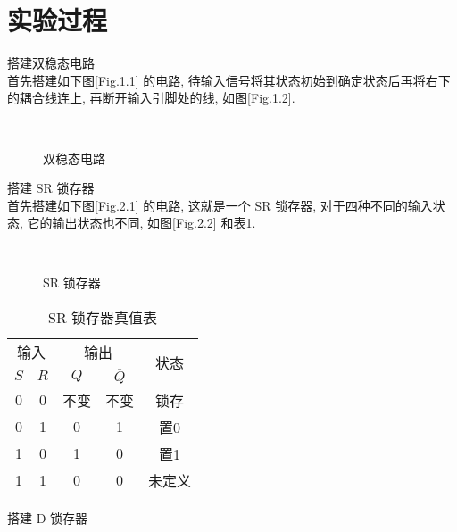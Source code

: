 \documentclass[UTF8,fontset=fandol]{ctexart}
\begin{document}
\section*{实验过程}
\begin{ExSteps}
  \step 搭建双稳态电路\\
  首先搭建如下图\ref{Fig.1.1} 的电路, 待输入信号将其状态初始到确定状态后再将右下的耦合线连上, 再断开输入引脚处的线, 如图\ref{Fig.1.2}.
  \begin{figure}[htbp]
    \centering
    \\
    \caption{双稳态电路}
    \label{Fig.1}
  \end{figure}
  \newpage
  \step 搭建 SR 锁存器\\
  首先搭建如下图\ref{Fig.2.1} 的电路, 这就是一个 SR 锁存器, 对于四种不同的输入状态, 它的输出状态也不同, 如图\ref{Fig.2.2} 和表\ref{Tab.1}.
  \begin{figure}[h]
    \centering
    \\
    \caption{SR 锁存器}
    \label{Fig.2}
  \end{figure}
  \begin{table}[!ht]
    \vspace*{-2em}
    \centering
    \caption{SR 锁存器真值表}
    \label{Tab.1}
    \begin{tabular}{cc|cc|c} 
    \hline
    \multicolumn{2}{c|}{输入} & \multicolumn{2}{c|}{输出} & \multirow{2}{*}{状态}  \\ 
    \cline{1-4}
    $S$ & $R$               & $Q$ & $\overline{Q}$    &                      \\ 
    \hline
    0   & 0                 & 不变  & 不变                & 锁存                   \\
    0   & 1                 & 0   & 1                 & 置0                   \\
    1   & 0                 & 1   & 0                 & 置1                   \\
    1   & 1                 & 0   & 0                 & 未定义                  \\
    \hline
    \end{tabular}
    \end{table}
    \step 搭建 D 锁存器\\

\end{ExSteps}
\end{document}
